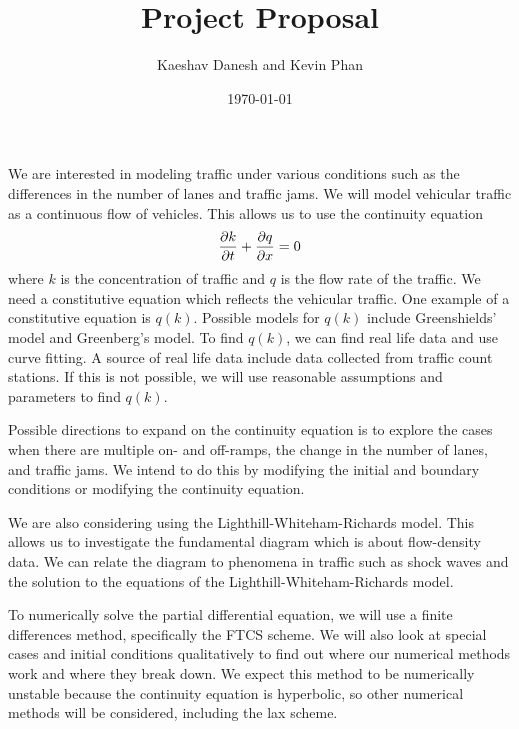 \documentclass[12pt]{article}
\title{Project Proposal}
\author{Kaeshav Danesh and Kevin Phan}
\date{\today}
\begin{document}
	
	\maketitle
    \vspace{-1mm}
    We are interested in modeling traffic under various conditions such as the differences in the number of lanes and traffic jams. We will model vehicular traffic as a continuous flow of vehicles. This allows us to use the continuity equation 
    \begin{equation}
        \pdv{k}{t} + \pdv{q}{x} = 0
    \end{equation}
    where $k$ is the concentration of traffic and $q$ is the flow rate of the traffic. We need a constitutive equation which reflects the vehicular traffic. One example of a constitutive equation is $q(k)$. Possible models for $q(k)$ include Greenshields' model and Greenberg's model. To find $q(k)$, we can find real life data and use curve fitting. A source of real life data include data collected from traffic count stations. If this is not possible, we will use reasonable assumptions and parameters to find $q(k)$. 
    
    Possible directions to expand on the continuity equation is to explore the cases when there are multiple on- and off-ramps, the change in the number of lanes, and traffic jams. We intend to do this by modifying the initial and boundary conditions or modifying the continuity equation. 
    
    We are also considering using the Lighthill-Whiteham-Richards model. This allows us to investigate the fundamental diagram which is about flow-density data. We can relate the diagram to phenomena in traffic such as shock waves and the solution to the equations of the Lighthill-Whiteham-Richards model.

    To numerically solve the partial differential equation, we will use a finite differences method, specifically the FTCS scheme.  We will also look at special cases and initial conditions qualitatively to find out where our numerical methods work and where they break down. We expect this method to be numerically unstable because the continuity equation is hyperbolic, so other numerical methods will be considered, including the lax scheme. 
\end{document}
